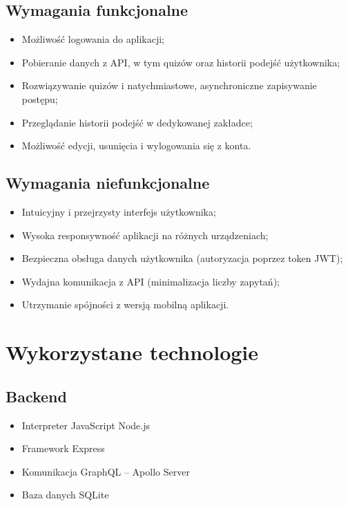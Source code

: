 \documentclass{article}
\begin{document}
    \subsection{Wymagania funkcjonalne}
	\begin{itemize}
		\item Możliwość logowania do aplikacji;
		\item Pobieranie danych z API, w tym quizów oraz historii podejść użytkownika;
		\item Rozwiązywanie quizów i natychmiastowe, asynchroniczne zapisywanie postępu;
		\item Przeglądanie historii podejść w dedykowanej zakładce;
		\item Możliwość edycji, usunięcia i wylogowania się z konta.
	\end{itemize}
	
	\subsection{Wymagania niefunkcjonalne}
	\begin{itemize}
		\item Intuicyjny i przejrzysty interfejs użytkownika;
		\item Wysoka responsywność aplikacji na różnych urządzeniach;
		\item Bezpieczna obsługa danych użytkownika (autoryzacja poprzez token JWT);
		\item Wydajna komunikacja z API (minimalizacja liczby zapytań);
		\item Utrzymanie spójności z wersją mobilną aplikacji.
	\end{itemize}

    \section{Wykorzystane technologie}
        \subsection{Backend}
        \begin{itemize}
            \item Interpreter JavaScript Node.js
            \item Framework Express
            \item Komunikacja GraphQL -- Apollo Server 
            \item Baza danych SQLite
        \end{itemize}
\end{document}
